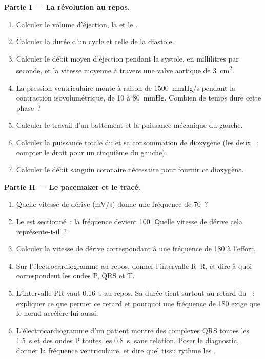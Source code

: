 \begin{problem}
\medskip
\noindent\textbf{Partie I --- La révolution au repos.}
\begin{enumerate}
  \item Calculer le volume d'éjection, la  et le .
  \item Calculer la durée d'un cycle et celle de la diastole.
  \item Calculer le débit moyen d'éjection pendant la systole, en
        millilitres par seconde, et la vitesse moyenne à travers une
        valve aortique de \qty{3}{cm^2}.
  \item La pression ventriculaire monte à raison de \qty{1500}{mmHg/s}
        pendant la contraction isovolumétrique, de 10 à \qty{80}{mmHg}.
        Combien de temps dure cette phase~?
  \item Calculer le travail d'un battement et la puissance mécanique du
         gauche.
  \item Calculer la puissance totale du  et sa consommation de
        dioxygène (les deux ~: compter le droit pour un
        cinquième du gauche).
  \item Calculer le débit sanguin coronaire nécessaire pour fournir ce
        dioxygène.
\end{enumerate}

\medskip
\noindent\textbf{Partie II --- Le pacemaker et le tracé.}
\begin{enumerate}[resume]
  \item Quelle vitesse de dérive (\unit{mV/s}) donne une fréquence de 70~?
  \item Le  est sectionné~: la fréquence devient 100. Quelle
        vitesse de dérive cela représente-t-il~?
  \item Calculer la vitesse de dérive correspondant à une fréquence de
        180 à l'effort.
  \item Sur l'électrocardiogramme au repos, donner l'intervalle R--R, et
        dire à quoi correspondent les ondes P, QRS et T.
  \item L'intervalle PR vaut \qty{0.16}{s} au repos. Sa durée tient
        surtout au retard du ~: expliquer ce que
        permet ce retard et pourquoi une fréquence de 180 exige que le
        nœud accélère lui aussi.
  \item L'électrocardiogramme d'un patient montre des complexes QRS
        toutes les \qty{1.5}{s} et des ondes P toutes les \qty{0.8}{s},
        sans relation. Poser le diagnostic, donner la fréquence
        ventriculaire, et dire quel tissu rythme les .
\end{enumerate}


\end{problem}
